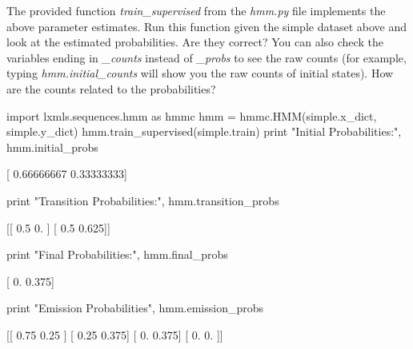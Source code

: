 \begin{exercise}
The provided function \emph{train\_supervised} from the \emph{hmm.py} file implements the above parameter estimates.
Run this function given the simple dataset above and look at the estimated probabilities. Are they correct? You can also check the variables ending in \emph{\_counts} instead of \emph{\_probs} to see the raw counts (for example, typing \emph{hmm.initial\_counts} will show you the raw counts of initial states). How are the counts related to the probabilities?

\begin{python}
import lxmls.sequences.hmm as hmmc
hmm = hmmc.HMM(simple.x_dict, simple.y_dict)
hmm.train_supervised(simple.train)
print "Initial Probabilities:", hmm.initial_probs

[ 0.66666667  0.33333333]

print "Transition Probabilities:", hmm.transition_probs

[[ 0.5    0.   ]
 [ 0.5    0.625]]

print "Final Probabilities:", hmm.final_probs

[ 0.     0.375]

print "Emission Probabilities", hmm.emission_probs

[[ 0.75   0.25 ]
 [ 0.25   0.375]
 [ 0.     0.375]
 [ 0.     0.   ]]
\end{python}
\end{exercise}


